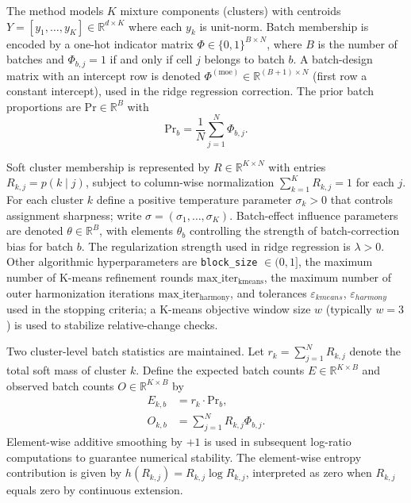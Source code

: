 \documentclass{article}
\begin{document}
The method models $K$ mixture components (clusters) with centroids $Y = [y_1, \dots, y_K] \in \mathbb{R}^{d \times K}$ where each $y_k$ is unit-norm. Batch membership is encoded by a one-hot indicator matrix $\Phi \in \{0,1\}^{B \times N}$, where $B$ is the number of batches and $\Phi_{b,j}=1$ if and only if cell $j$ belongs to batch $b$. A batch-design matrix with an intercept row is denoted $\Phi^{(\mathrm{moe})} \in \mathbb{R}^{(B+1) \times N}$ (first row a constant intercept), used in the ridge regression correction. The prior batch proportions are $\mathrm{Pr} \in \mathbb{R}^B$ with
\begin{equation}
    \mathrm{Pr}_b = \frac{1}{N} \sum_{j=1}^N \Phi_{b,j}.
\end{equation}

Soft cluster membership is represented by $R \in \mathbb{R}^{K \times N}$ with entries $R_{k,j} = p(k \mid j)$, subject to column-wise normalization $\sum_{k=1}^K R_{k,j} = 1$ for each $j$. For each cluster $k$ define a positive temperature parameter $\sigma_k > 0$ that controls assignment sharpness; write $\sigma = (\sigma_1, \dots, \sigma_K)$. Batch-effect influence parameters are denoted $\theta \in \mathbb{R}^B$, with elements $\theta_b$ controlling the strength of batch-correction bias for batch $b$. The regularization strength used in ridge regression is $\lambda > 0$. Other algorithmic hyperparameters are \texttt{block\_size} $\in (0,1]$, the maximum number of K-means refinement rounds $\mathrm{max\_iter_{kmeans}}$, the maximum number of outer harmonization iterations $\mathrm{max\_iter_{harmony}}$, and tolerances $\varepsilon_{kmeans}$, $\varepsilon_{harmony}$ used in the stopping criteria; a K-means objective window size $w$ (typically $w=3$) is used to stabilize relative-change checks.

Two cluster-level batch statistics are maintained. Let $r_k = \sum_{j=1}^N R_{k,j}$ denote the total soft mass of cluster $k$. Define the expected batch counts $E \in \mathbb{R}^{K \times B}$ and observed batch counts $O \in \mathbb{R}^{K \times B}$ by
\begin{align}
    E_{k,b} &= r_k \cdot \mathrm{Pr}_b, \\
    O_{k,b} &= \sum_{j=1}^N R_{k,j} \Phi_{b,j}.
\end{align}
Element-wise additive smoothing by $+1$ is used in subsequent log-ratio computations to guarantee numerical stability. The element-wise entropy contribution is given by $h(R_{k,j}) = R_{k,j} \log R_{k,j}$, interpreted as zero when $R_{k,j}$ equals zero by continuous extension.
\end{document}
